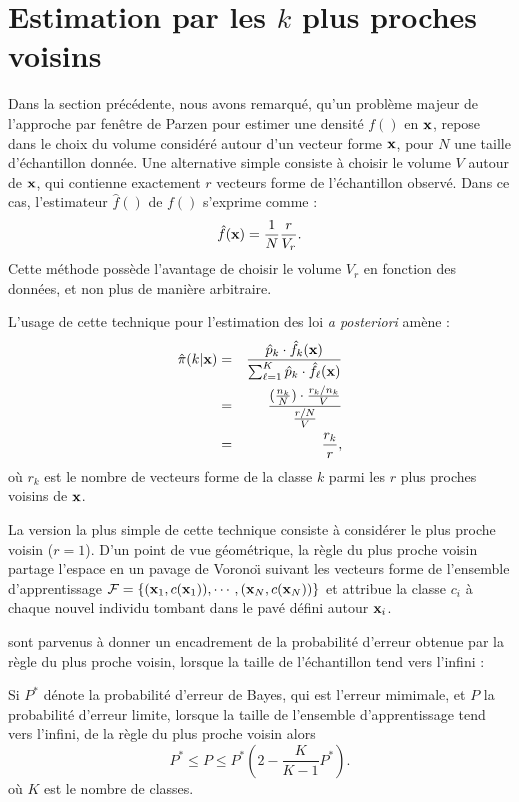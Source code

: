 \section{Estimation par les $k$ plus proches voisins}

Dans la section pr\'ec\'edente, nous avons remarqu\'e, qu'un probl\`eme
majeur de l'approche par fen\^etre de Parzen pour estimer une densit\'e
$f()$ en $\mbox{\bf x}$, repose dans le choix
du volume  consid\'er\'e autour d'un vecteur forme $\mbox{\bf x}$, pour $N$ une taille 
d'\'echantillon donn\'ee. Une alternative simple consiste \`a choisir le
volume $V$ autour de $\mbox{\bf x}$, qui contienne exactement $r$ vecteurs forme de 
l'\'echantillon observ\'e. Dans ce cas, l'estimateur $\hat{f}()$ de 
$f()$ s'exprime  comme :
$$
\hat{f}(\mbox{\bf x})=\frac{1}{N} \frac{r}{V_r}.
$$
Cette m\'ethode poss\`ede l'avantage de choisir le volume $V_r$ en fonction
des donn\'ees, et non plus de mani\`ere arbitraire.


L'usage de cette technique pour l'estimation des loi {\em a posteriori} 
am\`ene :
\begin{eqnarray*}
\hat{\pi}(k| \mbox{\bf x}) & = & \frac{\hat{p}_k \cdot \hat{f}_k(\mbox{\bf x})}{\sum_{\ell=1}^{K} \hat{p}_k \cdot \hat{f}_\ell(\mbox{\bf x})}\\
               & = & \frac{(\frac{n_k}{N})\cdot \frac{r_k/n_k}{V}}{\frac{r/N}{V}}\\
                 & = & \frac{r_k}{r},
\end{eqnarray*}
o\`u $r_k$ est le nombre de vecteurs forme de la classe $k$ parmi les $r$ plus
proches voisins de $\mbox{\bf x}$.


La version la plus simple de cette technique consiste \`a consid\'erer
le plus proche voisin ($r=1$). D'un point de vue g\'eom\'etrique,
la r\`egle du plus proche voisin partage l'espace en un pavage de Vorono\"{\i}
suivant les vecteurs forme de l'ensemble d'apprentissage 
${\cal F}=\{(\mbox{\bf x}_1,c(\mbox{\bf x}_1)),\cdots,(\mbox{\bf x}_N,c(\mbox{\bf x}_N))\}$ et attribue la 
classe $c_i$ \`a chaque nouvel individu tombant dans le pav\'e d\'efini
autour $\mbox{\bf x}_i$.

 sont parvenus \`a donner un encadrement de la 
probabilit\'e d'erreur obtenue par la r\`egle du plus proche voisin,
lorsque la taille de l'\'echantillon tend vers l'infini :
\begin{th}
Si $P^*$ d\'enote la probabilit\'e d'erreur de Bayes, qui est l'erreur
mimimale, et $P$ la 
probabilit\'e d'erreur limite, lorsque la taille de l'ensemble 
d'apprentissage tend vers l'infini, de la r\`egle du plus 
proche voisin alors
$$
P^*\leq P \leq P^* (2- \frac{K}{K-1}P^*).
$$ 
o\`u $K$ est le nombre de classes.
\end{th}


